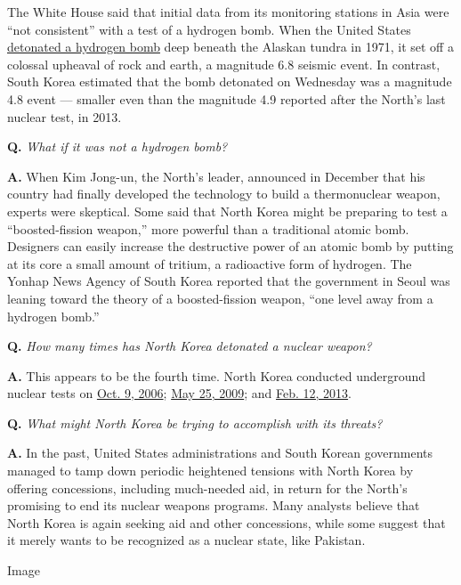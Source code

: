 The White House said that initial data from its monitoring stations in
Asia were ``not consistent'' with a test of a hydrogen bomb. When the
United States
\href{http://www.nytimes.com/2016/01/07/science/comparisons-dont-support-north-koreas-claims-of-a-hydrogen-bomb-experts-say.html}{detonated
a hydrogen bomb} deep beneath the Alaskan tundra in 1971, it set off a
colossal upheaval of rock and earth, a magnitude 6.8 seismic event. In
contrast, South Korea estimated that the bomb detonated on Wednesday was
a magnitude 4.8 event --- smaller even than the magnitude 4.9 reported
after the North's last nuclear test, in 2013.

\textbf{Q.} \emph{What if it was not a hydrogen bomb?}

\textbf{A.} When Kim Jong-un, the North's leader, announced in December
that his country had finally developed the technology to build a
thermonuclear weapon, experts were skeptical. Some said that North Korea
might be preparing to test a ``boosted-fission weapon,'' more powerful
than a traditional atomic bomb. Designers can easily increase the
destructive power of an atomic bomb by putting at its core a small
amount of tritium, a radioactive form of hydrogen. The Yonhap News
Agency of South Korea reported that the government in Seoul was leaning
toward the theory of a boosted-fission weapon, ``one level away from a
hydrogen bomb.''

\textbf{Q.} \emph{How many times has North Korea detonated a nuclear
weapon?}

\textbf{A.} This appears to be the fourth time. North Korea conducted
underground nuclear tests on
\href{http://www.nytimes.com/2006/10/09/world/asia/09korea.html}{Oct. 9,
2006};
\href{http://www.nytimes.com/2009/05/25/world/asia/25nuke.html}{May 25,
2009}; and
\href{http://www.nytimes.com/2013/02/12/world/asia/north-korea-nuclear-test.html}{Feb.
12, 2013}.

\textbf{Q.} \emph{What might North Korea be trying to accomplish with
its threats?}

\textbf{A.} In the past, United States administrations and South Korean
governments managed to tamp down periodic heightened tensions with North
Korea by offering concessions, including much-needed aid, in return for
the North's promising to end its nuclear weapons programs. Many analysts
believe that North Korea is again seeking aid and other concessions,
while some suggest that it merely wants to be recognized as a nuclear
state, like Pakistan.

Image

